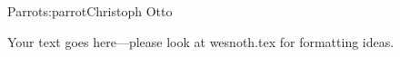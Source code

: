 \begin{aosachapter}{Parrot}{s:parrot}{Christoph Otto}

Your text goes here---please look at wesnoth.tex for formatting ideas.

\end{aosachapter}
